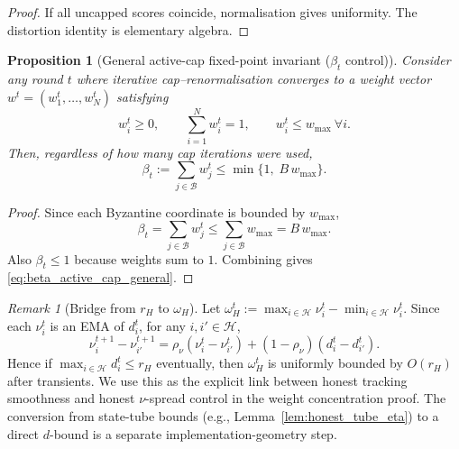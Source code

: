 \documentclass[11pt,a4paper]{article}
\newtheorem{proposition}{Proposition}
\theoremstyle{remark}
\newtheorem{remark}{Remark}
\newcommand{\HH}{\mathcal{H}}
\newcommand{\BB}{\mathcal{B}}
\begin{document}
\begin{proof}
If all uncapped scores coincide, normalisation gives uniformity.
The distortion identity is elementary algebra.
\end{proof}

\begin{proposition}[General active-cap fixed-point invariant (\(\beta_t\) control)]
\label{prop:beta_active_cap_general}
Consider any round \(t\) where iterative cap--renormalisation converges to a
weight vector \(w^t=(w_1^t,\dots,w_N^t)\) satisfying
\[
    w_i^t\ge 0,\qquad \sum_{i=1}^N w_i^t=1,\qquad w_i^t\le w_{\max}\ \forall i.
\]
Then, regardless of how many cap iterations were used,
\begin{equation}
    \beta_t
    :=
    \sum_{j\in\BB} w_j^t
    \le
    \min\{1,\;B\,w_{\max}\}.
    \label{eq:beta_active_cap_general}
\end{equation}
\end{proposition}

\begin{proof}
Since each Byzantine coordinate is bounded by \(w_{\max}\),
\[
    \beta_t=\sum_{j\in\BB}w_j^t\le \sum_{j\in\BB} w_{\max}=B\,w_{\max}.
\]
Also \(\beta_t\le 1\) because weights sum to \(1\). Combining gives
\eqref{eq:beta_active_cap_general}.
\end{proof}

\begin{remark}[Bridge from \(r_H\) to \(\omega_H\)]
\label{rem:rh_to_omegah}
Let
\(
\omega_H^t:=\max_{i\in\HH}\nu_i^t-\min_{i\in\HH}\nu_i^t
\).
Since each \(\nu_i^t\) is an EMA of \(d_i^t\), for any \(i,i'\in\HH\),
\[
    \nu_i^{t+1}-\nu_{i'}^{t+1}
    =
    \rho_\nu(\nu_i^t-\nu_{i'}^t)
    +(1-\rho_\nu)(d_i^t-d_{i'}^t).
\]
Hence if \(\max_{i\in\HH}d_i^t\le r_H\) eventually, then
\(\omega_H^t\) is uniformly bounded by \(O(r_H)\) after transients. We use this
as the explicit link between honest tracking smoothness and honest
\(\nu\)-spread control in the weight concentration proof. The conversion from
state-tube bounds (e.g., Lemma~\ref{lem:honest_tube_eta}) to a direct
\(d\)-bound is a separate implementation-geometry step.
\end{remark}
\end{document}
